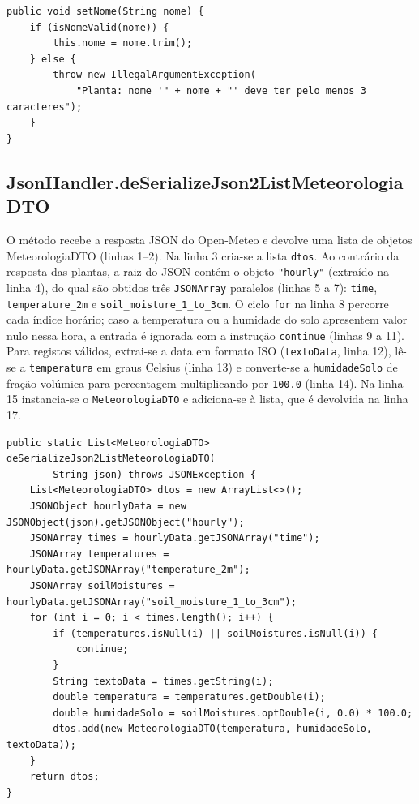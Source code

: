 \documentclass[runningheads,a4paper]{llncs}
\begin{document}
\begin{lstlisting}[caption={Planta.setNome},label=lst:setnome]
public void setNome(String nome) {
    if (isNomeValid(nome)) {
        this.nome = nome.trim();
    } else {
        throw new IllegalArgumentException(
            "Planta: nome '" + nome + "' deve ter pelo menos 3 caracteres");
    }
}
\end{lstlisting}

\subsection{JsonHandler.deSerializeJson2ListMeteorologiaDTO}
O método recebe a resposta JSON do Open-Meteo e devolve uma lista de objetos
MeteorologiaDTO (linhas 1--2). Na linha 3 cria-se a lista \texttt{dtos}. Ao
contrário da resposta das plantas, a raiz do JSON contém o objeto
\texttt{"hourly"} (extraído na linha 4), do qual são obtidos três
\texttt{JSONArray} paralelos (linhas 5 a 7): \texttt{time},
\texttt{temperature\_2m} e \texttt{soil\_moisture\_1\_to\_3cm}. O ciclo
\texttt{for} na linha 8 percorre cada índice horário; caso a temperatura ou a
humidade do solo apresentem valor nulo nessa hora, a entrada é ignorada com a
instrução \texttt{continue} (linhas 9 a 11). Para registos válidos, extrai-se a
data em formato ISO (\texttt{textoData}, linha 12), lê-se a
\texttt{temperatura} em graus Celsius (linha 13) e converte-se a
\texttt{humidadeSolo} de fração volúmica para percentagem multiplicando por
\texttt{100.0} (linha 14). Na linha 15 instancia-se o \texttt{MeteorologiaDTO} e
adiciona-se à lista, que é devolvida na linha 17.

\begin{lstlisting}[caption={JsonHandler.deSerializeJson2ListMeteorologiaDTO},label=lst:desermeteo]
public static List<MeteorologiaDTO> deSerializeJson2ListMeteorologiaDTO(
        String json) throws JSONException {
    List<MeteorologiaDTO> dtos = new ArrayList<>();
    JSONObject hourlyData = new JSONObject(json).getJSONObject("hourly");
    JSONArray times = hourlyData.getJSONArray("time");
    JSONArray temperatures = hourlyData.getJSONArray("temperature_2m");
    JSONArray soilMoistures = hourlyData.getJSONArray("soil_moisture_1_to_3cm");
    for (int i = 0; i < times.length(); i++) {
        if (temperatures.isNull(i) || soilMoistures.isNull(i)) {
            continue;
        }
        String textoData = times.getString(i);
        double temperatura = temperatures.getDouble(i);
        double humidadeSolo = soilMoistures.optDouble(i, 0.0) * 100.0;
        dtos.add(new MeteorologiaDTO(temperatura, humidadeSolo, textoData));
    }
    return dtos;
}
\end{lstlisting}
\end{document}
